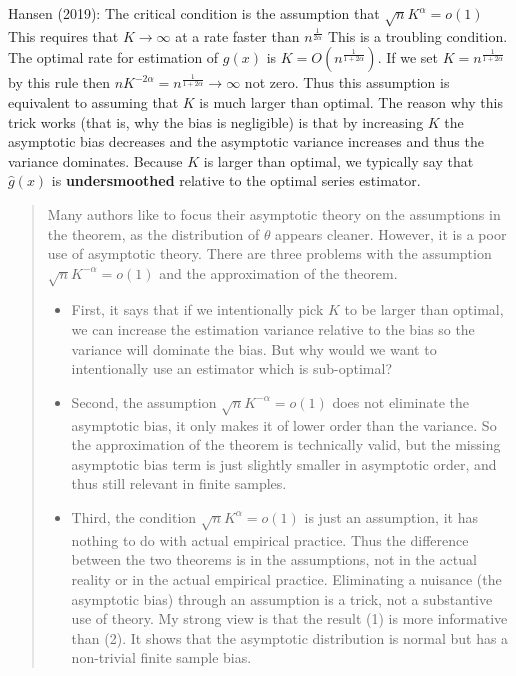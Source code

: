 \documentclass[12pt,]{book}
\providecommand{\tightlist}{%
  \setlength{\itemsep}{0pt}\setlength{\parskip}{0pt}}
\begin{document}
Hansen (2019): The critical condition is the assumption that \(\sqrt{n} K^{\alpha} = o(1)\) This requires that \(K \to \infty\) at a rate faster than \(n^{\frac{1}{2\alpha}}\) This is a troubling condition. The optimal rate for estimation of \(g(x)\) is \(K = O(n^{\frac{1}{1+ 2\alpha}})\). If we set \(K = n^{\frac{1}{1+ 2\alpha}}\) by this rule then \(n K^{-2\alpha} = n^{\frac{1}{1+ 2\alpha}} \to \infty\) not zero. Thus this assumption is equivalent to assuming that \(K\) is much larger than optimal. The reason why this trick works (that is, why the bias is negligible) is that by increasing \(K\) the asymptotic bias decreases and the asymptotic variance increases and thus the variance dominates. Because \(K\) is larger than optimal, we typically say that \(\hat{g}(x)\) is \textbf{undersmoothed} relative to the optimal series estimator.

\begin{quote}
Many authors like to focus their asymptotic theory on the assumptions in the theorem, as the distribution of \(\theta\) appears cleaner. However, it is a poor use of asymptotic theory. There are three problems with the assumption \(\sqrt{n} K^{-\alpha} = o(1)\) and the approximation of the theorem.

\begin{itemize}
\tightlist
\item
  First, it says that if we intentionally pick \(K\) to be larger than optimal, we can increase the estimation variance relative to the bias so the variance will dominate the bias. But why would we want to intentionally use an estimator which is sub-optimal?
\item
  Second, the assumption \(\sqrt{n} K^{-\alpha} = o(1)\) does not eliminate the asymptotic bias, it only makes it of lower order than the variance. So the approximation of the theorem is technically valid, but the missing asymptotic bias term is just slightly smaller in asymptotic order, and thus still relevant in finite samples.
\item
  Third, the condition \(\sqrt{n} K^{\alpha} = o(1)\) is just an assumption, it has nothing to do with actual empirical practice. Thus the difference between the two theorems is in the assumptions, not in the actual reality or in the actual empirical practice. Eliminating a nuisance (the asymptotic bias) through an assumption is a trick, not a substantive use of theory. My strong view is that the result (1) is more informative than (2). It shows that the asymptotic distribution is normal but has a non-trivial finite sample bias.
\end{itemize}
\end{quote}
\end{document}
